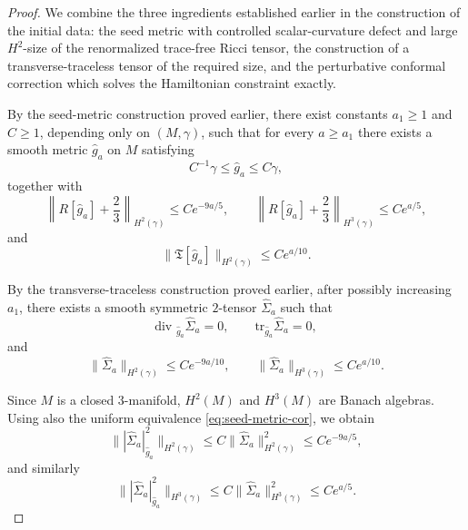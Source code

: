 \documentclass{amsart}
\renewcommand{\div}{\mbox{div }}
\newcommand{\tr}{\mbox{tr}}
\begin{document}
\begin{proof}
We combine the three ingredients established earlier in the construction of the initial data: the seed metric with controlled scalar-curvature defect and large \(H^{2}\)-size of the renormalized trace-free Ricci tensor, the construction of a transverse-traceless tensor of the required size, and the perturbative conformal correction which solves the Hamiltonian constraint exactly.

\medskip

\noindent
By the seed-metric construction proved earlier, there exist constants \(a_{1}\ge 1\) and \(C\ge 1\), depending only on \((M,\gamma)\), such that for every \(a\ge a_{1}\) there exists a smooth metric \(\widehat g_{a}\) on \(M\) satisfying
\begin{equation}
\label{eq:seed-metric-cor}
C^{-1}\gamma\le \widehat g_{a}\le C\gamma,
\end{equation}
together with
\begin{equation}
\label{eq:seed-scalar-cor}
\left\|R[\widehat g_{a}]+\frac23\right\|_{H^{2}(\gamma)}
\le C e^{-9a/5},
\qquad
\left\|R[\widehat g_{a}]+\frac23\right\|_{H^{3}(\gamma)}
\le C e^{a/5},
\end{equation}
and
\begin{equation}
\label{eq:seed-T-cor}
\|\mathfrak T[\widehat g_{a}]\|_{H^{2}(\gamma)}
\le C e^{a/10}.
\end{equation}

\medskip

\noindent By the transverse-traceless construction proved earlier, after possibly increasing \(a_{1}\), there exists a smooth symmetric \(2\)-tensor \(\widehat\Sigma_{a}\) such that
\begin{equation}
\label{eq:seed-TT-cor}
\div_{\widehat g_{a}}\widehat\Sigma_{a}=0,
\qquad
\tr_{\widehat g_{a}}\widehat\Sigma_{a}=0,
\end{equation}
and
\begin{equation}
\label{eq:seed-sigma-cor}
\|\widehat\Sigma_{a}\|_{H^{2}(\gamma)}\le C e^{-9a/10},
\qquad
\|\widehat\Sigma_{a}\|_{H^{3}(\gamma)}\le C e^{a/10}.
\end{equation}

\noindent Since \(M\) is a closed \(3\)-manifold, \(H^{2}(M)\) and \(H^{3}(M)\) are Banach algebras. Using also the uniform equivalence \eqref{eq:seed-metric-cor}, we obtain
\begin{equation}
\label{eq:sigma-square-H2-cor}
\bigl\||\widehat\Sigma_{a}|_{\widehat g_{a}}^{2}\bigr\|_{H^{2}(\gamma)}
\le C \|\widehat\Sigma_{a}\|_{H^{2}(\gamma)}^{2}
\le C e^{-9a/5},
\end{equation}
and similarly
\begin{equation}
\label{eq:sigma-square-H3-cor}
\bigl\||\widehat\Sigma_{a}|_{\widehat g_{a}}^{2}\bigr\|_{H^{3}(\gamma)}
\le C \|\widehat\Sigma_{a}\|_{H^{3}(\gamma)}^{2}
\le C e^{a/5}.
\end{equation}


\end{proof}
\end{document}
